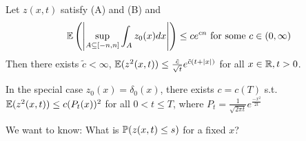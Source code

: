 \begin{lemma}\label{lem:5.9}
    Let $z(x,t)$ satisfy (A) and (B) and 
    \[\mathbb{E}\left(\left\vert\sup_{A\subseteq [-n,n]}\int_A z_0(x)dx\right\vert\right)\leq ce^{cn}\text{ for some }c\in(0,\infty)\]
    Then there exists $\tilde{c}<\infty$, $\mathbb{E}(z^2(x,t))\leq \frac{\tilde{c}}{\sqrt{t}}e^{\tilde{c}(t+|x|)}$ for all $x\in\mathbb{R},t>0$.

\end{lemma}

   In the special case $z_0(x)=\delta_0(x)$, there exists $c=c(T)$ s.t.$\mathbb{E}(z^2(x,t))\leq c(P_t(x))^2$ for all $0<t\leq T$, where $P_t=\frac{1}{\sqrt{2\pi t}}e^{\frac{-x^2}{2t}}$

We want to know: What is $\mathbb{P}(z(x,t)\leq s)$ for a fixed $x$?



